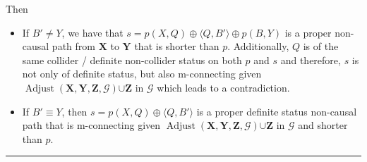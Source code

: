\documentclass[twoside]{article}
\DeclareMathOperator{\Adjust}{Adjust}
\newcommand{\adjustb}[2][X,Y,Z]{\Adjust(\mb{#1},#2)}
\newcommand{\mb}[1]{\mathbf{#1}}
\newcommand{\g}[1][G]{\mathcal{#1}}
\newenvironment{proofof}[1][]{\begin{trivlist}
\item[\hskip \labelsep {\bfseries Proof of #1.}]}{\hfill\BlackBox\end{trivlist}}
\newcommand{\BlackBox}{\rule{1.5ex}{1.5ex}}
\begin{document}
\begin{proofof}[Lemma \ref{lem:adjust-and-o-pag-helper}]
\begin{itemize}
        Then
        \begin{itemize}
            \item If $B' \neq Y$, we have that $s = p(X,Q) \oplus \langle Q,B' \rangle \oplus p(B,Y)$ is  a proper non-causal path from $\mb{X}$ to $\mb{Y}$ that is shorter than $p$. Additionally, $Q$ is of the same collider / definite non-collider status on both $p$ and $s$ and therefore, $s$ is not only of definite status, but also m-connecting given $\adjustb{\g} {\cup \mb{Z}}$ in $\g$ which leads to a contradiction.
            \item If $B' \equiv Y$, then $s= p(X,Q) \oplus \langle Q,B' \rangle$ is a proper definite status non-causal path that is m-connecting given $\adjustb{\g} {\cup \mb{Z}}$ in $\g$ and shorter than $p$.
        \end{itemize}
    \end{itemize}
\end{proofof}







\vfill
\end{document}
